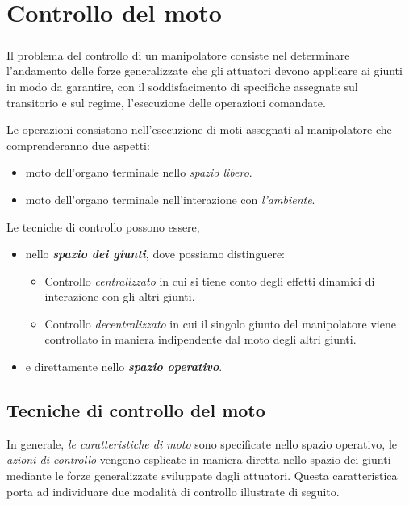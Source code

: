 \chapter{Controllo del moto}
\paragraph{}
Il problema del controllo di un manipolatore consiste nel determinare l'andamento delle forze generalizzate che gli attuatori devono applicare ai giunti in modo da garantire, con il soddisfacimento di specifiche assegnate sul transitorio e sul regime, l'esecuzione delle operazioni comandate.

Le operazioni consistono nell'esecuzione di moti assegnati al manipolatore che comprenderanno due aspetti:
\begin{itemize}
	\item moto dell'organo terminale nello \emph{spazio libero}.
	\item moto dell'organo terminale nell'interazione con \emph{l'ambiente}.
\end{itemize} 
Le tecniche di controllo possono essere,
\begin{itemize}
	\item nello \emph{\textbf{spazio dei giunti}}, dove possiamo distinguere:
	\begin{itemize}
		\item Controllo \emph{centralizzato} in cui si tiene conto degli effetti dinamici di interazione con gli altri giunti.
		\item Controllo \emph{decentralizzato} in cui il singolo giunto del manipolatore viene controllato in maniera indipendente dal moto degli altri giunti. 
	\end{itemize}
	\item e direttamente nello \emph{\textbf{spazio operativo}}.
\end{itemize}

\section{Tecniche di controllo del moto}
In generale, \emph{le caratteristiche di moto} sono specificate nello spazio operativo, le \emph{azioni di controllo} vengono esplicate in maniera diretta nello spazio dei giunti mediante le forze generalizzate sviluppate dagli attuatori. Questa caratteristica porta ad individuare due modalità di controllo illustrate di seguito.

